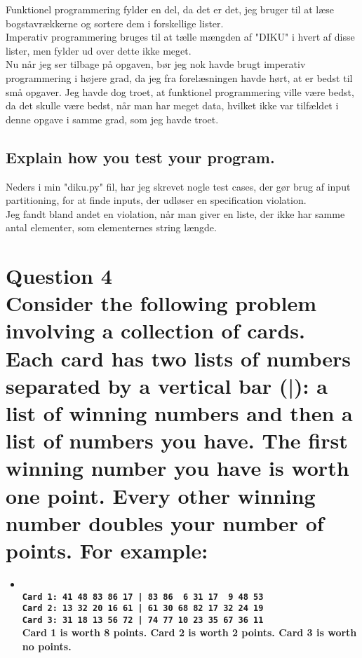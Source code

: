 \documentclass[a4paper,12pt]{article}
\begin{document}
Funktionel programmering fylder en del, da det er det, jeg bruger til at læse bogstavrækkerne og sortere dem i forskellige lister.\\
Imperativ programmering bruges til at tælle mængden af "DIKU" i hvert af disse lister, men fylder ud over dette ikke meget.\\
Nu når jeg ser tilbage på opgaven, bør jeg nok havde brugt imperativ programmering i højere grad, da jeg fra forelæsningen havde hørt, at er bedst til små opgaver. Jeg havde dog troet, at funktionel programmering ville være bedst, da det skulle være bedst, når man har meget data, hvilket ikke var tilfældet i denne opgave i samme grad, som jeg havde troet.

\subsection[Explain how you test your program]{Explain how you test your program.}

Neders i min "diku.py" fil, har jeg skrevet nogle test cases, der gør brug af input partitioning, for at finde inputs, der udløser en specification violation.\\
Jeg fandt bland andet en violation, når man giver en liste, der ikke har samme antal elementer, som elementernes string længde.

\section[Question 4 - Cards]{Question 4\\
Consider the following problem involving a collection of cards.
Each card has two lists of numbers separated by a vertical bar (|): a list of winning numbers and then a list of numbers you have.
The first winning number you have is worth one point. Every other winning number doubles your number of points.
For example:}
\begin{itemize}
    \item[] \textbf{\\
    \lstinline{Card 1: 41 48 83 86 17 | 83 86  6 31 17  9 48 53}\\
    \lstinline{Card 2: 13 32 20 16 61 | 61 30 68 82 17 32 24 19}\\
    \lstinline{Card 3: 31 18 13 56 72 | 74 77 10 23 35 67 36 11}\\
    Card 1 is worth 8 points. Card 2 is worth 2 points. Card 3 is worth no points.}
\end{itemize}
\end{document}
